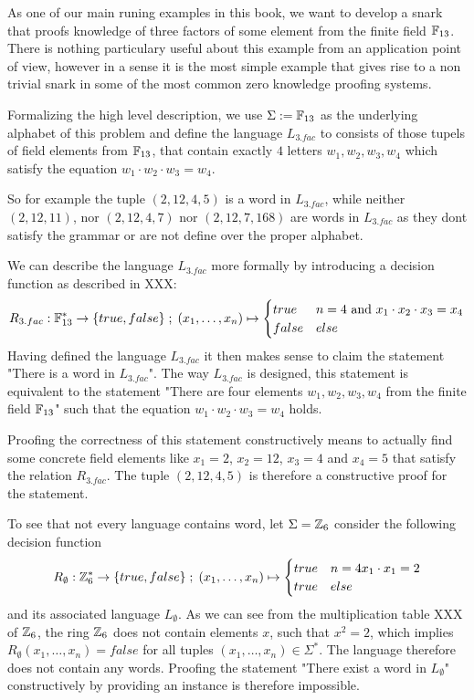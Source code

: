 \begin{example}[3-Factorization]
As one of our main runing examples in this book, we want to develop a snark that proofs knowledge of three factors of some element from the finite field $\mathbb{F}_{13}$. There is nothing particulary useful about this example from an application point of view, however in a sense it is the most simple example that gives rise to a non trivial snark in some of the most common zero knowledge proofing systems. 

Formalizing the high level description, we use $\Sigma := \mathbb{F}_{13}$ as the underlying alphabet of this problem and define the language $L_{3.fac}$ to consists of those tupels of field elements from $\mathbb{F}_{13}$, that contain exactly $4$ letters $w_1,w_2,w_3,w_4$ which satisfy the equation $w_1\cdot w_2\cdot w_3 =w_4$.   

So for example the tuple $(2, 12, 4, 5)$ is a word in $L_{3.fac}$, while neither $(2, 12, 11)$, nor $(2, 12, 4, 7)$ nor $(2, 12, 7, 168)$ are words in $L_{3.fac}$ as they dont satisfy the grammar or are not define over the proper alphabet. 

We can describe the language $L_{3.fac}$ more formally by introducing a decision function as described in XXX:
$$
R_{3.fac} : \mathbb{F}_{13}^* \to \{true, false\}\;;\;
(x_1,\ldots,x_n) \mapsto
\begin{cases}
true & n=4 \text{ and } x_1\cdot x_2 \cdot x_3 = x_4\\
false & else
\end{cases}
$$
Having defined the language $L_{3.fac}$ it then makes sense to claim the statement "There is a word in $L_{3.fac}$". The way $L_{3.fac}$ is designed, this statement is equivalent to the statement "There are four elements $w_1,w_2,w_3,w_4$ from the finite field $\mathbb{F}_{13}$" such that the equation $w_1\cdot w_2\cdot w_3 =w_4$ holds. 

Proofing the correctness of this statement constructively means to actually find some concrete field elements like $x_1= 2$, $x_2 =12$, $x_3=4$ and $x_4 = 5$ that satisfy the relation $R_{3.fac}$. The tuple $(2,12,4,5)$ is therefore a constructive proof for the statement.
\begin{example} To see that not every language contains word, let $\Sigma = \mathbb{Z}_6$ consider the following decision function 
$$
R_{\emptyset} : \mathbb{Z}_{6}^* \to \{true, false\}\;;\;
(x_1,\ldots,x_n) \mapsto
\begin{cases}
true & n=4 x_1\cdot x_1 = 2\\
true & else
\end{cases}
$$
and its associated language $L_\emptyset$. As we can see from the multiplication table XXX of $\mathbb{Z}_6$, the ring $\mathbb{Z}_6$ does not contain elements $x$, such that $x^2 =2$, which implies $R_{\emptyset}(x_1,\ldots,x_n)=false$ for all tuples $(x_1,\ldots,x_n)\in \Sigma^*$. The language therefore does not contain any words. Proofing the statement "There exist a word in $L_\emptyset$" constructively by providing an instance is therefore impossible.
\end{example}
\end{example}
